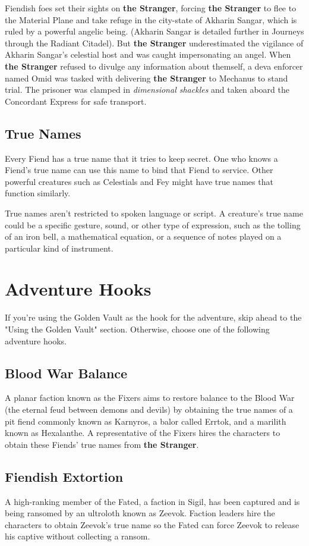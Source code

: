\documentclass[10pt,a4paper,twoside,bg=print,twocolumn,openany,nodeprecatedcode]{dndbook}
\begin{document}
Fiendish foes set their sights on \textbf{the Stranger}, forcing \textbf{the Stranger} to flee to the Material Plane and take refuge in the city-state of Akharin Sangar, which is ruled by a powerful angelic being. (Akharin Sangar is detailed further in Journeys through the Radiant Citadel). But \textbf{the Stranger} underestimated the vigilance of Akharin Sangar's celestial host and was caught impersonating an angel. When \textbf{the Stranger} refused to divulge any information about themself, a deva enforcer named Omid was tasked with delivering \textbf{the Stranger} to Mechanus to stand trial. The prisoner was clamped in \textit{dimensional shackles} and taken aboard the Concordant Express for safe transport.

\subsection{True Names}
Every Fiend has a true name that it tries to keep secret. One who knows a Fiend's true name can use this name to bind that Fiend to service. Other powerful creatures such as Celestials and Fey might have true names that function similarly.

True names aren't restricted to spoken language or script. A creature's true name could be a specific gesture, sound, or other type of expression, such as the tolling of an iron bell, a mathematical equation, or a sequence of notes played on a particular kind of instrument.

\section{Adventure Hooks}
If you're using the Golden Vault as the hook for the adventure, skip ahead to the "Using the Golden Vault" section. Otherwise, choose one of the following adventure hooks.

\subsection{Blood War Balance}
A planar faction known as the Fixers aims to restore balance to the Blood War (the eternal feud between demons and devils) by obtaining the true names of a pit fiend commonly known as Karnyros, a balor called Errtok, and a marilith known as Hexalanthe. A representative of the Fixers hires the characters to obtain these Fiends' true names from \textbf{the Stranger}.

\subsection{Fiendish Extortion}
A high-ranking member of the Fated, a faction in Sigil, has been captured and is being ransomed by an ultroloth known as Zeevok. Faction leaders hire the characters to obtain Zeevok's true name so the Fated can force Zeevok to release his captive without collecting a ransom.
\end{document}
